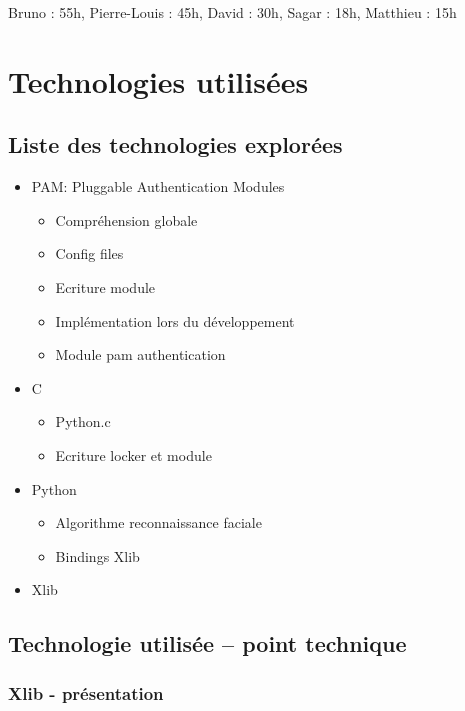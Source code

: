 \documentclass[french]{report}
\begin{document}
\vspace{0.5cm}
Bruno : 55h, Pierre-Louis : 45h, David : 30h, Sagar : 18h, Matthieu : 15h


\chapter{Technologies utilisées}

\newpage

\section{Liste des technologies explorées}

\begin{itemize}[label=\textbullet, font=\normalfont \color{blue}]
  \item{PAM: Pluggable Authentication Modules}
  \begin{itemize}[label=\textbullet]
    \item{Compréhension globale}
    \item{Config files}
    \item{Ecriture module}
    \item{Implémentation lors du développement}
    \item{Module pam authentication}
  \end{itemize}
  \item{C}
  \begin{itemize}[label=\textbullet]
    \item{Python.c}
    \item{Ecriture locker et module}
  \end{itemize}
  \item{Python}
  \begin{itemize}[label=\textbullet]
    \item{Algorithme reconnaissance faciale}
    \item{Bindings Xlib}
  \end{itemize}
  \item{Xlib}
\end{itemize}

\section{Technologie utilisée – point technique}

\subsection{Xlib - présentation}
\end{document}
